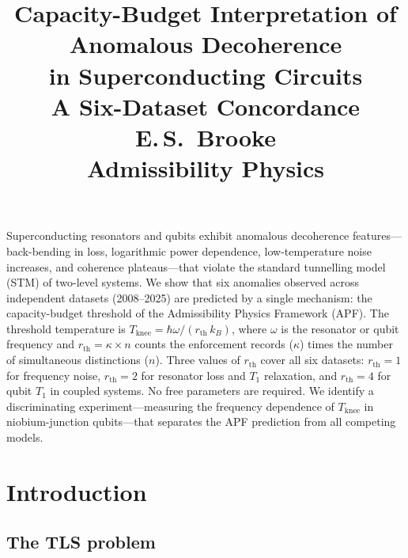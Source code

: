 \documentclass[11pt]{article}
\title{
  \textbf{Capacity-Budget Interpretation of Anomalous Decoherence\\
  in Superconducting Circuits}\\[6pt]
  \large A Six-Dataset Concordance\\[4pt]
  \normalsize E.\,S.\ Brooke\\
  Admissibility Physics
}
\author{}
\date{}
\begin{document}
\maketitle


\begin{apbox}[Abstract]
Superconducting resonators and qubits exhibit anomalous decoherence features---back-bending in loss, logarithmic power dependence, low-temperature noise increases, and coherence plateaus---that violate the standard tunnelling model (STM) of two-level systems.  We show that six anomalies observed across independent datasets (2008--2025) are predicted by a single mechanism: the capacity-budget threshold of the Admissibility Physics Framework (APF).  The threshold temperature is $T_{\mathrm{knee}} = \hbar\omega / (r_{\mathrm{th}} \, k_B)$, where $\omega$ is the resonator or qubit frequency and $r_{\mathrm{th}} = \kappa \times n$ counts the enforcement records ($\kappa$) times the number of simultaneous distinctions ($n$).  Three values of $r_{\mathrm{th}}$ cover all six datasets: $r_{\mathrm{th}} = 1$ for frequency noise, $r_{\mathrm{th}} = 2$ for resonator loss and $T_1$ relaxation, and $r_{\mathrm{th}} = 4$ for qubit $T_1$ in coupled systems.  No free parameters are required.  We identify a discriminating experiment---measuring the frequency dependence of $T_{\mathrm{knee}}$ in niobium-junction qubits---that separates the APF prediction from all competing models.
\end{apbox}


\section{Introduction}

\subsection{The TLS problem}
\end{document}
